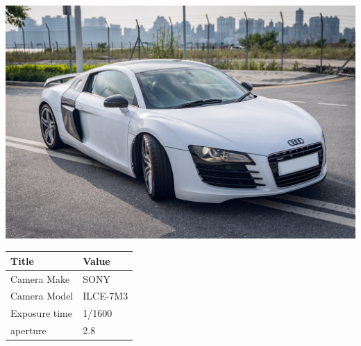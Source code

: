 \documentclass[twocolumn]{article}
\begin{document}
\begin{center}
\includegraphics[width=0.7\columnwidth]{Image6}
\newline
\newline
\newline
\newline
\newline

\begin{tabular}{| m{3cm} | m{3cm} |}
\hline

Title  &  Value   \\

\hline
Camera Make  & SONY   \\
\hline
Camera Model  & ILCE-7M3   \\
\hline
Exposure time  & 1/1600  \\
\hline
aperture & 2.8 \\
\hline

\end{tabular}


\end{center}

\newpage
\end{document}
